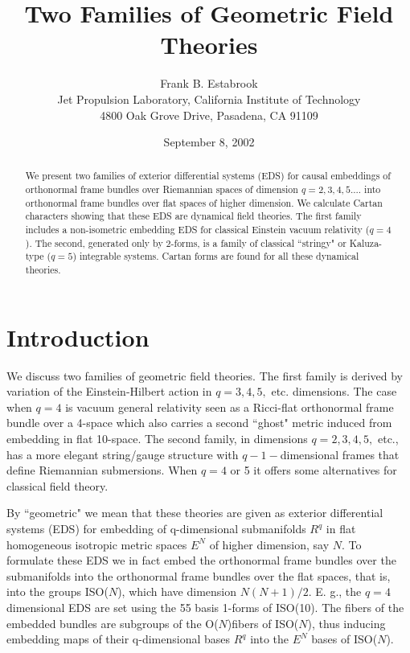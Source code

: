 \documentclass[a4paper,a4paper]{article}
\title{Two Families of Geometric Field Theories}
\author{Frank B. Estabrook \\
Jet Propulsion Laboratory,  California Institute of Technology \\
4800 Oak Grove Drive,  Pasadena,  CA 91109}
\date{September 8, 2002}
\begin{document}
\maketitle

\begin{abstract}

We present  two families of exterior differential systems (EDS) for
causal embeddings of orthonormal frame bundles over Riemannian spaces of
dimension $q = 2,  3,  4,  5....$ into orthonormal frame bundles over flat spaces
of higher dimension.  We calculate Cartan characters showing that these
EDS are dynamical field theories.  The first family includes a
non-isometric  embedding  EDS  for classical Einstein vacuum relativity
($q = 4$). The second, generated only by 2-forms, is a family of classical
``stringy" or Kaluza-type ($q = 5$) integrable systems.  Cartan forms
are found for all these dynamical theories.
\end{abstract}

\section{Introduction}

        We discuss two families of geometric field theories.  The first
family is derived by variation of the Einstein-Hilbert action in $q =
3,  4,  5, $ etc. dimensions.  The case when $q = 4$ is vacuum general relativity
seen as a Ricci-flat orthonormal frame bundle over a 4-space which also
carries a second ``ghost"  metric induced from embedding in flat 10-space.  The
second family,  in dimensions  $q = 2,  3,  4,  5, $ etc., has a more
elegant string/gauge structure with $q-1-$dimensional frames that define
Riemannian submersions. When $q = 4$ or 5 it offers some alternatives
for classical field theory.

        By ``geometric" we mean that these theories are given as
exterior differential systems (EDS) for  embedding of q-dimensional
submanifolds ${R^q}$ in flat homogeneous isotropic metric spaces \({E^N}\) of higher
dimension,  say $N$. To formulate these EDS we in fact embed the
orthonormal frame bundles over the submanifolds into the orthonormal frame bundles over
the flat spaces,  that is,  into the groups ISO($N$), which have
dimension $N(N + 1)/2$. E. g., the $q = 4$ dimensional EDS are set using the 55 basis
1-forms of ISO(10).  The fibers of the embedded bundles are subgroups of
the O($N$)fibers of ISO($N$),  thus inducing embedding maps of their q-dimensional
bases ${R^q}$ into the ${E^N}$ bases of ISO($N$).
\end{document}
